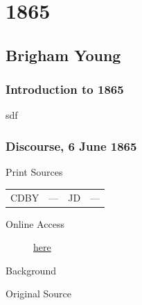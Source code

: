 \section{1865}

	\subsection{Brigham Young}
		\label{EMS-1865-BY}

		\subsubsection{Introduction to 1865}
		
			sdf
			
		\subsubsection{Discourse, 6 June 1865}
			\label{EMS-1865-BY-6-JUN-1865}
			
			\begin{description}
					\item[Print Sources]
				\end{description}

					\begin{tabular}{p{0.5in}p{1in}p{0.5in}p{1in}}
					CDBY	& ---		& JD 		& --- \\
					\end{tabular}
				
				\begin{description}
					\item[Online Access] \href{https://newspapers.lib.utah.edu/details?id=2597909}{here}
				\end{description}
				
				\begin{description}
					\item[Background]
				\end{description}
				
					\phantom{.}
				
				\begin{description}
					\item[Original Source]
				\end{description}
				
